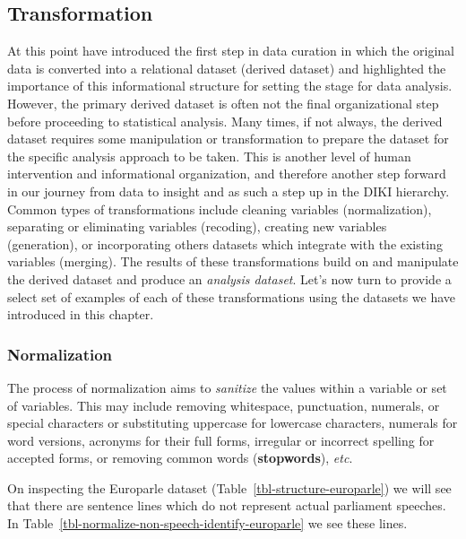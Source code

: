 \documentclass[
  letterpaper,
]{scrbook}
\begin{document}
\hypertarget{transformation}{%
\subsection{Transformation}\label{transformation}}

At this point have introduced the first step in data curation in which
the original data is converted into a relational dataset (derived
dataset) and highlighted the importance of this informational structure
for setting the stage for data analysis. However, the primary derived
dataset is often not the final organizational step before proceeding to
statistical analysis. Many times, if not always, the derived dataset
requires some manipulation or transformation to prepare the dataset for
the specific analysis approach to be taken. This is another level of
human intervention and informational organization, and therefore another
step forward in our journey from data to insight and as such a step up
in the DIKI hierarchy. Common types of transformations include cleaning
variables (normalization), separating or eliminating variables
(recoding), creating new variables (generation), or incorporating others
datasets which integrate with the existing variables (merging). The
results of these transformations build on and manipulate the derived
dataset and produce an \emph{analysis dataset}. Let's now turn to
provide a select set of examples of each of these transformations using
the datasets we have introduced in this chapter.

\hypertarget{normalization}{%
\subsubsection{Normalization}\label{normalization}}

The process of normalization aims to \emph{sanitize} the values within a
variable or set of variables. This may include removing whitespace,
punctuation, numerals, or special characters or substituting uppercase
for lowercase characters, numerals for word versions, acronyms for their
full forms, irregular or incorrect spelling for accepted forms, or
removing common words (\textbf{stopwords}), \emph{etc}.

On inspecting the Europarle dataset
(Table~\ref{tbl-structure-europarle}) we will see that there are
sentence lines which do not represent actual parliament speeches. In
Table~\ref{tbl-normalize-non-speech-identify-europarle} we see these
lines.
\end{document}
